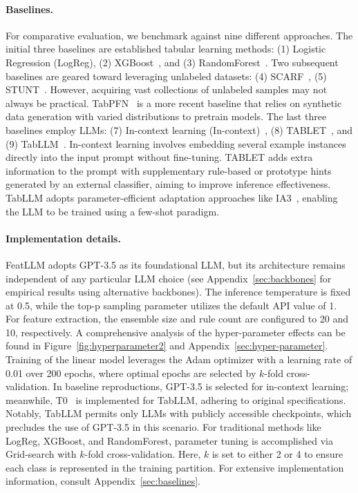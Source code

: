 \vspace*{-0.12in}
\paragraph{Baselines.}
For comparative evaluation, we benchmark against nine different approaches. The initial three baselines are established tabular learning methods: (1) Logistic Regression (LogReg), (2) XGBoost~\cite{chen2016xgboost}, and (3) RandomForest~\cite{ho1995random}. Two subsequent baselines are geared toward leveraging unlabeled datasets: (4) SCARF~\cite{bahri2022scarf}, (5) STUNT~\cite{nam2023stunt}. However, acquiring vast collections of unlabeled samples may not always be practical. TabPFN~\cite{hollmann2022tabpfn} is a more recent baseline that relies on synthetic data generation with varied distributions to pretrain models. The last three baselines employ LLMs: (7) In-context learning (In-context)~\cite{wei2022emergent}, (8) TABLET~\cite{slack2023tablet}, and (9) TabLLM~\cite{hegselmann2023tabllm}. In-context learning involves embedding several example instances directly into the input prompt without fine-tuning. TABLET adds extra information to the prompt with supplementary rule-based or prototype hints generated by an external classifier, aiming to improve inference effectiveness. TabLLM adopts parameter-efficient adaptation approaches like IA3~\cite{liu2022few}, enabling the LLM to be trained using a few-shot paradigm.

\vspace*{-0.12in}
\paragraph{Implementation details.}
\textsf{FeatLLM} adopts GPT-3.5 as its foundational LLM, but its architecture remains independent of any particular LLM choice (see Appendix~\ref{sec:backbones} for empirical results using alternative backbones). The inference temperature is fixed at 0.5, while the top-p sampling parameter utilizes the default API value of 1. For feature extraction, the ensemble size and rule count are configured to 20 and 10, respectively. A comprehensive analysis of the hyper-parameter effects can be found in Figure~\ref{fig:hyperparameter2} and Appendix~\ref{sec:hyper-parameter}. Training of the linear model leverages the Adam optimizer with a learning rate of 0.01 over 200 epochs, where optimal epochs are selected by $k$-fold cross-validation. In baseline reproductions, GPT-3.5 is selected for in-context learning; meanwhile, T0~\cite{sanh2022multitask} is implemented for TabLLM, adhering to original specifications. Notably, TabLLM permits only LLMs with publicly accessible checkpoints, which precludes the use of GPT-3.5 in this scenario. For traditional methods like LogReg, XGBoost, and RandomForest, parameter tuning is accomplished via Grid-search with $k$-fold cross-validation. Here, $k$ is set to either 2 or 4 to ensure each class is represented in the training partition. For extensive implementation information, consult Appendix~\ref{sec:baselines}.

